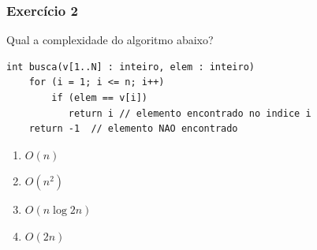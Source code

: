 \documentclass[aspectratio=169]{beamer}
\begin{document}
\begin{frame}[fragile]\frametitle{Exercício 2} %
Qual a complexidade do algoritmo abaixo?
{\scriptsize
\begin{verbatim}
int busca(v[1..N] : inteiro, elem : inteiro)
    for (i = 1; i <= n; i++)
        if (elem == v[i])
           return i // elemento encontrado no indice i
    return -1  // elemento NAO encontrado
\end{verbatim}
}
\begin{enumerate}[A]
	\item $O(n)$ %
	\item $O(n^2)$
	\item $O(n \log 2n)$
	\item $O(2n)$
\end{enumerate}
\end{frame}
\end{document}
